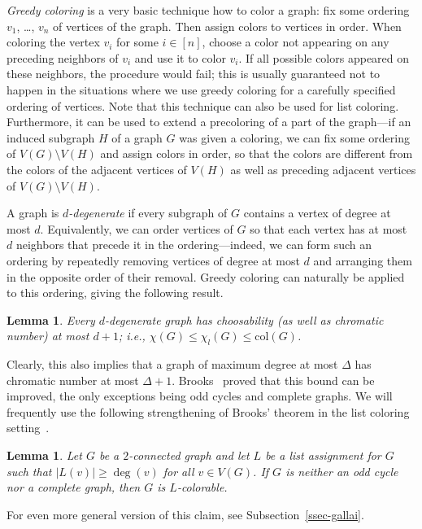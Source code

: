 \documentclass[12pt,twoside,openright,a4paper]{book}
\newtheorem{lemma}[theorem]{Lemma}
\newcommand{\col}{\text{col}}
\begin{document}
\emph{Greedy coloring} is a very basic technique how to color a graph: fix some ordering $v_1$, \ldots, $v_n$ of
vertices of the graph.  Then assign colors to vertices in order. When coloring the vertex $v_i$ for some $i\in[n]$,
choose a color not appearing on any preceding neighbors of $v_i$ and use it to color $v_i$.  If all possible colors
appeared on these neighbors, the procedure would fail; this is usually guaranteed not to happen in the situations where
we use greedy coloring for a carefully specified ordering of vertices.  Note that this technique can also be used for list coloring.
Furthermore, it can be used to extend a precoloring of a part of the graph---if an induced subgraph $H$ of a graph $G$ was given
a coloring, we can fix some ordering of $V(G)\setminus V(H)$ and assign colors in order, so that the colors are different
from the colors of the adjacent vertices of $V(H)$ as well as preceding adjacent vertices of $V(G)\setminus V(H)$.

A graph is \emph{$d$-degenerate} if every subgraph of $G$ contains a vertex of degree at most $d$.
Equivalently, we can order vertices of $G$ so that each vertex has at most $d$ neighbors that precede it in the
ordering---indeed, we can form such an ordering by repeatedly removing vertices of degree at most $d$ and
arranging them in the opposite order of their removal.
Greedy coloring can naturally be applied to this ordering, giving the following result.
\begin{lemma}\label{lemma:degen}
Every $d$-degenerate graph has choosability (as well as chromatic number) at most $d+1$; i.e., $\chi(G)\le\chi_l(G)\le \col(G)$.
\end{lemma}

Clearly, this also implies that a graph of maximum degree at most $\Delta$ has chromatic number
at most $\Delta+1$.  Brooks~\cite{brooks1941colouring} proved that this bound can be improved, the only exceptions
being odd cycles and complete graphs.  We will frequently use the following strengthening of Brooks' theorem
in the list coloring setting~\cite{galfor}.
\begin{lemma}\label{lemma:gallai1}
Let $G$ be a $2$-connected graph and let $L$ be a list assignment for $G$ such that $|L(v)|\ge \deg(v)$ for all $v\in V(G)$.
If $G$ is neither an odd cycle nor a complete graph, then $G$ is $L$-colorable.
\end{lemma}
For even more general version of this claim, see Subsection~\ref{ssec-gallai}.
\end{document}
